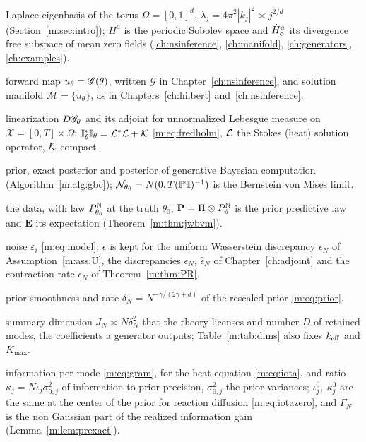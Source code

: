 \begin{description}[leftmargin=2.2em,labelwidth=1.8em,labelsep=0.4em,itemsep=0pt,parsep=0pt]
\item[$e_j,\ \lambda_j$] Laplace eigenbasis of the torus $\Omega=[0,1]^d$, $\lambda_j=4\pi^2|k_j|^2\asymp j^{2/d}$ (Section~\ref{m:sec:intro}); $H^a$ is the periodic Sobolev space and $\dot H^{a}_\diamond$ its divergence free subspace of mean zero fields (\ref{ch:nsinference}, \ref{ch:manifold}, \ref{ch:generators}, \ref{ch:examples}).
\item[$\Gcal,\ \mathcal M$] forward map $u_\theta=\mathscr{G}(\theta)$, written $\mathcal G$ in Chapter~\ref{ch:nsinference}, and solution manifold $\mathcal M=\{u_\theta\}$, as in Chapters~\ref{ch:hilbert} and~\ref{ch:nsinference}.
\item[$\I_\theta,\ \I^*_\theta$] linearization $D\mathscr{G}_\theta$ and its adjoint for unnormalized Lebesgue measure on $\mathcal X=[0,T]\times\Omega$; $\mathbb{I}_\theta^*\mathbb{I}_\theta=\mathcal{L}^*\mathcal{L}+\mathcal{K}$ \eqref{m:eq:fredholm}, $\mathcal{L}$ the Stokes (heat) solution operator, $\mathcal{K}$ compact.
\item[$\Pi,\ \PiN,\ \Pihat$] prior, exact posterior and posterior of generative Bayesian computation (Algorithm~\ref{m:alg:gbc}); $\mathcal{N}_{\theta_0}=N(0,T(\mathbb{I}^*\mathbb{I})^{-1})$ is the Bernstein von Mises limit.
\item[$Z^{(N)},\ \mathbf P$] the data, with law $P^{\mathbb{N}}_{\theta_0}$ at the truth $\theta_0$; $\mathbf P=\Pi\otimes P^{\mathbb{N}}_\vartheta$ is the prior predictive law and $\mathbf E$ its expectation (Theorem~\ref{m:thm:jwbvm}).
\item[$\varepsilon,\ \epsilon$] noise $\varepsilon_i$ \eqref{m:eq:model}; $\epsilon$ is kept for the uniform Wasserstein discrepancy $\bar\epsilon_N$ of Assumption~\ref{m:ass:U}, the discrepancies $\epsilon_N$, $\hat\epsilon_N$ of Chapter~\ref{ch:adjoint} and the contraction rate $\epsilon_N$ of Theorem~\ref{m:thm:PR}.
\item[$\gamma,\ \delta_N$] prior smoothness and rate $\delta_N=N^{-\gamma/(2\gamma+d)}$ of the rescaled prior \eqref{m:eq:prior}.
\item[$J_N,\ D$] summary dimension $J_N\asymp N\delta_N^2$ that the theory licenses and number $D$ of retained modes, the coefficients a generator outputs; Table~\ref{m:tab:dims} also fixes $k_{\rm eff}$ and $K_{\max}$.
\item[$\iota_j,\ \kappa_j$] information per mode \eqref{m:eq:gram}, for the heat equation \eqref{m:eq:iota}, and ratio $\kappa_j=N\iota_j\sigma_{0,j}^2$ of information to prior precision, $\sigma_{0,j}^2$ the prior variances; $\iota^0_j,\ \kappa^0_j$ are the same at the center of the prior for reaction diffusion \eqref{m:eq:iotazero}, and $\Gamma_N$ is the non Gaussian part of the realized information gain (Lemma~\ref{m:lem:prexact}).

\end{description}
